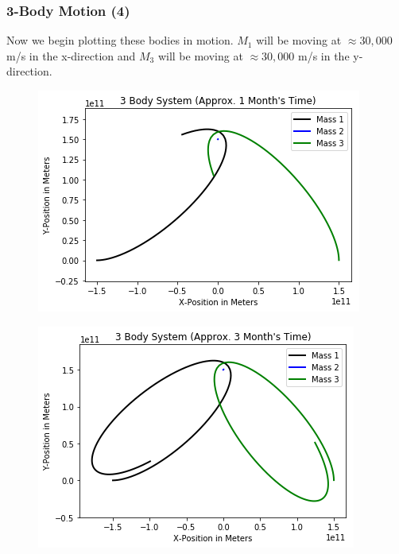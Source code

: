 \documentclass{beamer}
\begin{document}
\begin{frame}
\frametitle{3-Body Motion (4)}
Now we begin plotting these bodies in motion. $M_1$ will be moving at $\approx 30,000$ m/s in the x-direction and $M_3$ will be moving at $\approx 30,000$ m/s in the y-direction.
\begin{multicols}{2}
\begin{figure}
\begin{center}
\includegraphics[width=1.0\linewidth]{3BodyDynamics3.png}
\end{center}
\end{figure}
\begin{figure}
\begin{center}
\includegraphics[width=1.0\linewidth]{3BodyDynamics4.png}
\end{center}
\end{figure}
\end{multicols}
\end{frame}
\end{document}
